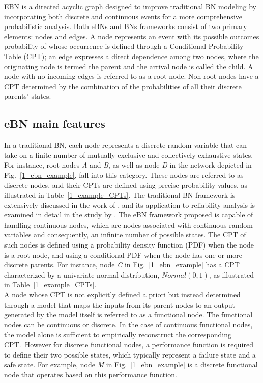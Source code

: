 
EBN is a directed acyclic graph designed to improve traditional BN modeling by incorporating both discrete and continuous events for a more comprehensive probabilistic analysis.
Both eBNs and BNs frameworks consist of two primary elements: nodes and edges. A node represents an event with its possible outcomes probability of whose occurrence is defined through a Conditional Probability Table (CPT); an edge expresses a direct dependence among two nodes, where the originating node is termed the parent and the arrival node is called the child.
A node with no incoming edges is referred to as a root node. 
Non-root nodes have a CPT determined by the combination of the probabilities of all their discrete parents' states.\\

\subsection{eBN main features}
In a traditional BN, each node represents a discrete random variable that can take on a finite number of mutually exclusive and collectively exhaustive states.
For instance, root nodes \textit{A} and  \textit{B}, as well as node \textit{D} in the network depicted in Fig.~\ref{1_ebn_example}, fall into this category.
These nodes are referred to as discrete nodes, and their CPTs are defined using precise probability values, as illustrated in Table~\ref{1_example_CPTs}.
The traditional BN framework is extensively discussed in the work of \textcite{russell_computer}, and its application to reliability analysis is examined in detail in the study by \textcite{langseth_bayesian_2007}.
The eBN framework proposed is capable of handling continuous nodes, which are nodes associated with continuous random variables and consequently, an infinite number of possible states.
The CPT of such nodes is defined using a probability density function (PDF) when the node is a root node, and using a conditional PDF when the node has one or more discrete parents.
For instance, node \textit{C} in Fig.~\ref{1_ebn_example} has a CPT characterized by a univariate normal distribution, $Normal(0,1)$, as illustrated in Table~\ref{1_example_CPTs}. \\  
A node whose CPT is not explicitly defined a priori but instead determined through a model that maps the inputs from its parent nodes to an output generated by the model itself is referred to as a functional node.
The functional nodes can be continuous or discrete. 
In the case of continuous functional nodes, the model alone is sufficient to empirically reconstruct the corresponding CPT.\ 
However for discrete functional nodes, a performance function is required to define their two possible states, which typically represent a failure state and a safe state.
For example, node \textit{M} in Fig.~\ref{1_ebn_example} is a discrete functional node that operates based on this performance function. \\

